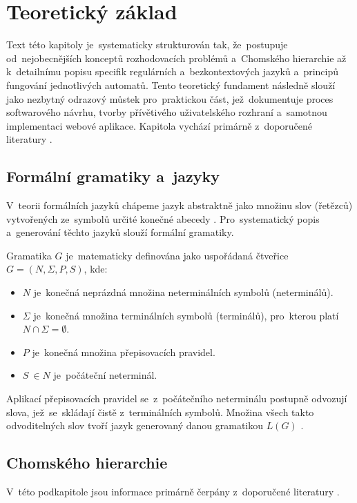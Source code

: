 \documentclass[
  master,
  program=ainfvs,
  printversion,
  figures=false,
  tables=false,
  glossaries,
  index
]{kidiplom}
\begin{document}
\newpage
\section{Teoretický základ}
Text této kapitoly je~systematicky strukturován tak, že~postupuje od~nejobecnějších konceptů rozhodovacích problémů a~Chomského hierarchie až k~detailnímu popisu specifik regulárních a~bezkontextových jazyků a~principů fungování jednotlivých automatů. Tento teoretický fundament následně slouží jako nezbytný odrazový můstek pro~praktickou část, jež~dokumentuje proces softwarového návrhu, tvorby přívětivého uživatelského rozhraní a~samotnou implementaci webové aplikace. Kapitola vychází primárně z~doporučené literatury \cite{jancar_ti,cerna_fja,balun_fj,osicka_sloz}.

\subsection{Formální gramatiky a~jazyky}
V~teorii formálních jazyků chápeme jazyk abstraktně jako množinu slov (řetězců) vytvořených ze~symbolů určité konečné abecedy \cite[kapitola~1.2]{cerna_fja}. Pro~systematický popis a~generování těchto jazyků slouží formální gramatiky. 
\begin{definition}
Gramatika $G$ je~matematicky definována jako uspořádaná čtveřice $G = (N, \Sigma, P, S)$, kde:
\begin{itemize}
    \item $N$ je~konečná neprázdná množina neterminálních symbolů (neterminálů).
    \item $\Sigma$ je~konečná množina terminálních symbolů (terminálů), pro~kterou platí $N \cap \Sigma = \emptyset$.
    \item $P$ je~konečná množina přepisovacích pravidel.
    \item $S~\in N$ je~počáteční neterminál.
\end{itemize}
\end{definition}
Aplikací přepisovacích pravidel se~z~počátečního neterminálu postupně odvozují slova, jež~se~skládají čistě z~terminálních symbolů. Množina všech takto odvoditelných slov tvoří jazyk generovaný danou gramatikou $L(G)$ \cite[kapitola~17]{balun_fj}.

\subsection{Chomského hierarchie}
V~této podkapitole jsou informace primárně čerpány z~doporučené literatury \cite{jancar_ti,cerna_fja,hopcroft_ullman}.
\end{document}
